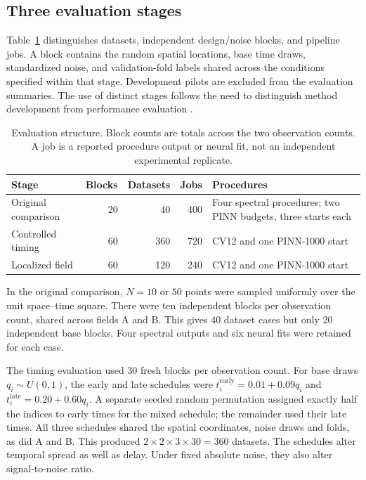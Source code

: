 \documentclass[11pt,a4paper]{article}
\begin{document}
\subsection{Three evaluation stages}
Table~\ref{tab:design} distinguishes datasets, independent design/noise blocks, and pipeline jobs. A block contains the random spatial locations, base time draws, standardized noise, and validation-fold labels shared across the conditions specified within that stage. Development pilots are excluded from the evaluation summaries. The use of distinct stages follows the need to distinguish method development from performance evaluation \citep{ref068,ref080}.
\begin{table}[htbp]\centering\small
\caption{Evaluation structure. Block counts are totals across the two observation counts. A job is a reported procedure output or neural fit, not an independent experimental replicate.}\label{tab:design}
\begin{tabular}{lrrrp{53mm}}\toprule
Stage & Blocks & Datasets & Jobs & Procedures\\\midrule
Original comparison & 20 & 40 & 400 & Four spectral procedures; two PINN budgets, three starts each\\
Controlled timing & 60 & 360 & 720 & CV12 and one PINN-1000 start\\
Localized field & 60 & 120 & 240 & CV12 and one PINN-1000 start\\\bottomrule
\end{tabular}
\end{table}

In the original comparison, $N=10$ or $50$ points were sampled uniformly over the unit space--time square. There were ten independent blocks per observation count, shared across fields A and B. This gives 40 dataset cases but only 20 independent base blocks. Four spectral outputs and six neural fits were retained for each case.

The timing evaluation used 30 fresh blocks per observation count. For base draws $q_i\sim U(0,1)$, the early and late schedules were $t_i^{\mathrm{early}}=0.01+0.09q_i$ and $t_i^{\mathrm{late}}=0.20+0.60q_i$. A separate seeded random permutation assigned exactly half the indices to early times for the mixed schedule; the remainder used their late times. All three schedules shared the spatial coordinates, noise draws and folds, as did A and B. This produced $2\times2\times3\times30=360$ datasets. The schedules alter temporal spread as well as delay. Under fixed absolute noise, they also alter signal-to-noise ratio.
\end{document}
